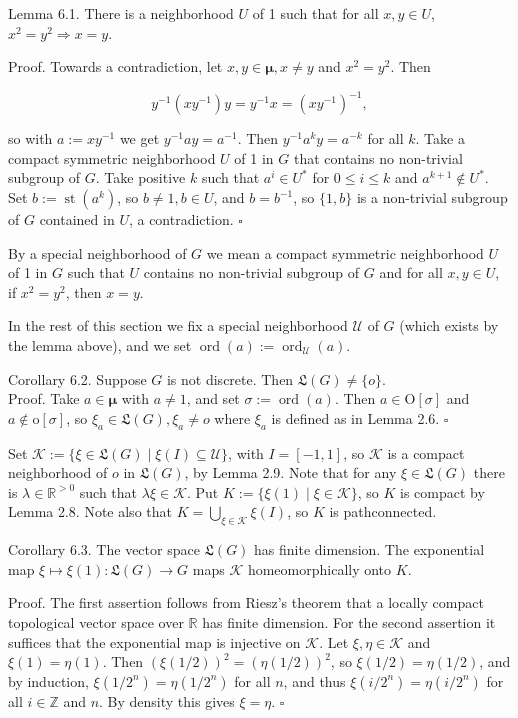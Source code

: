 \documentclass[10pt]{article}
\begin{document}
Lemma 6.1. There is a neighborhood $U$ of 1 such that for all $x, y \in U$, $x^{2}=y^{2} \Longrightarrow x=y$.

Proof. Towards a contradiction, let $x, y \in \boldsymbol{\mu}, x \neq y$ and $x^{2}=y^{2}$. Then

$$
y^{-1}\left(x y^{-1}\right) y=y^{-1} x=\left(x y^{-1}\right)^{-1},
$$

so with $a:=x y^{-1}$ we get $y^{-1} a y=a^{-1}$. Then $y^{-1} a^{k} y=a^{-k}$ for all $k$. Take a compact symmetric neighborhood $U$ of 1 in $G$ that contains no non-trivial subgroup of $G$. Take positive $k$ such that $a^{i} \in U^{*}$ for $0 \leq i \leq k$ and $a^{k+1} \notin U^{*}$. Set $b:=\operatorname{st}\left(a^{k}\right)$, so $b \neq 1, b \in U$, and $b=b^{-1}$, so $\{1, b\}$ is a non-trivial subgroup of $G$ contained in $U$, a contradiction. \(\square\)

By a special neighborhood of $G$ we mean a compact symmetric neighborhood $U$ of 1 in $G$ such that $U$ contains no non-trivial subgroup of $G$ and for all $x, y \in U$, if $x^{2}=y^{2}$, then $x=y$.

In the rest of this section we fix a special neighborhood $\mathcal{U}$ of $G$ (which exists by the lemma above), and we set $\operatorname{ord}(a):=\operatorname{ord}_{\mathcal{U}}(a)$.

Corollary 6.2. Suppose $G$ is not discrete. Then $\mathfrak{L}(G) \neq\{o\}$.\\
Proof. Take $a \in \boldsymbol{\mu}$ with $a \neq 1$, and set $\sigma:=\operatorname{ord}(a)$. Then $a \in \mathrm{O}[\sigma]$ and $a \notin \mathrm{o}[\sigma]$, so $\xi_{a} \in \mathfrak{L}(G), \xi_{a} \neq o$ where $\xi_{a}$ is defined as in Lemma 2.6. \(\square\)

Set $\mathcal{K}:=\{\xi \in \mathfrak{L}(G) \mid \xi(I) \subseteq \mathcal{U}\}$, with $I=[-1,1]$, so $\mathcal{K}$ is a compact neighborhood of $o$ in $\mathfrak{L}(G)$, by Lemma 2.9. Note that for any $\xi \in \mathfrak{L}(G)$ there is $\lambda \in \mathbb{R}^{>0}$ such that $\lambda \xi \in \mathcal{K}$. Put $K:=\{\xi(1) \mid \xi \in \mathcal{K}\}$, so $K$ is compact by Lemma 2.8. Note also that $K=\bigcup_{\xi \in \mathcal{K}} \xi(I)$, so $K$ is pathconnected.

Corollary 6.3. The vector space $\mathfrak{L}(G)$ has finite dimension. The exponential map $\xi \mapsto \xi(1): \mathfrak{L}(G) \rightarrow G$ maps $\mathcal{K}$ homeomorphically onto $K$.

Proof. The first assertion follows from Riesz's theorem that a locally compact topological vector space over $\mathbb{R}$ has finite dimension. For the second assertion it suffices that the exponential map is injective on $\mathcal{K}$. Let $\xi, \eta \in \mathcal{K}$ and $\xi(1)=\eta(1)$. Then $(\xi(1 / 2))^{2}=(\eta(1 / 2))^{2}$, so $\xi(1 / 2)=\eta(1 / 2)$, and by induction, $\xi\left(1 / 2^{n}\right)=\eta\left(1 / 2^{n}\right)$ for all $n$, and thus $\xi\left(i / 2^{n}\right)=\eta\left(i / 2^{n}\right)$ for all $i \in \mathbb{Z}$ and $n$. By density this gives $\xi=\eta$. \(\square\)
\end{document}
